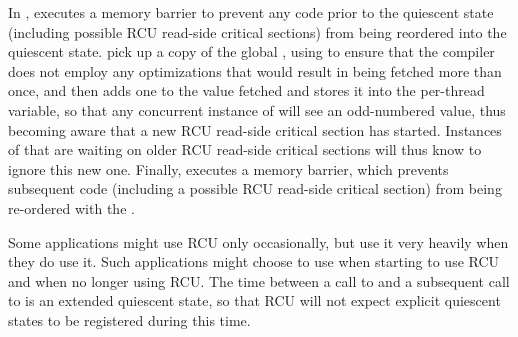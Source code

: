 \begin{fcvref}
In ,  executes a memory barrier
to prevent any code prior to the quiescent state (including possible
RCU read-side critical sections) from being reordered
into the quiescent state.
 pick up
a copy of the global , using
 to ensure that the compiler does not employ any
optimizations that would result in  being fetched
more than once,
and then adds one to the value fetched and stores it into
the per-thread  variable, so that any concurrent
instance of  will see an odd-numbered value,
thus becoming aware that a new RCU read-side critical section has started.
Instances of  that are waiting on older
RCU read-side critical sections will thus know to ignore this new one.
Finally,  executes a memory barrier, which prevents subsequent
code (including a possible RCU read-side critical section) from being
re-ordered with the .
\end{fcvref}

\QuickQuizEnd

Some applications might use RCU only occasionally, but use it very heavily
when they do use it.
Such applications might choose to use  when
starting to use RCU and  when no longer
using RCU\@.
The time between a call to  and a subsequent
call to  is an extended quiescent state,
so that RCU will not expect explicit quiescent states to be registered
during this time.

